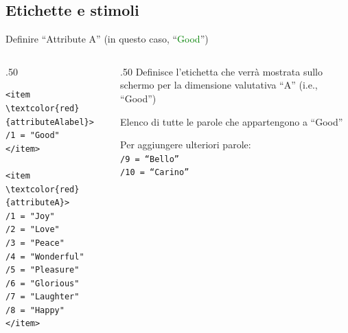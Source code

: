 \documentclass{beamer}
\begin{document}
\subsection*{Etichette e stimoli}

\begin{frame}[fragile]
	Definire ``Attribute A'' (in questo caso, ``\textcolor{green}{Good}'')
	
	\begin{columns}
		\begin{column}[T]{.50\linewidth}
			\begin{small}
					\begin{Verbatim}[commandchars=\\\{\}]
<item \textcolor{red}{attributeAlabel}>
/1 = "Good"
</item>
					
<item \textcolor{red}{attributeA}>
/1 = "Joy"
/2 = "Love"
/3 = "Peace"
/4 = "Wonderful"
/5 = "Pleasure"
/6 = "Glorious"
/7 = "Laughter"
/8 = "Happy"
</item>
				\end{Verbatim}
			\end{small}
		\end{column}
	
		\begin{column}[T]{.50\linewidth}
			\vspace{5mm}
		Definisce l'etichetta che verrà mostrata sullo schermo per la dimensione valutativa ``A'' (i.e., ``Good'')
		
		\vspace{10mm}
		
		Elenco di tutte le parole che appartengono a ``Good''
		
		Per aggiungere ulteriori parole: \\ \texttt{/9 = ``Bello''  \\  /10 = ``Carino''}
	\end{column}
	\end{columns}



\end{frame}
\end{document}
